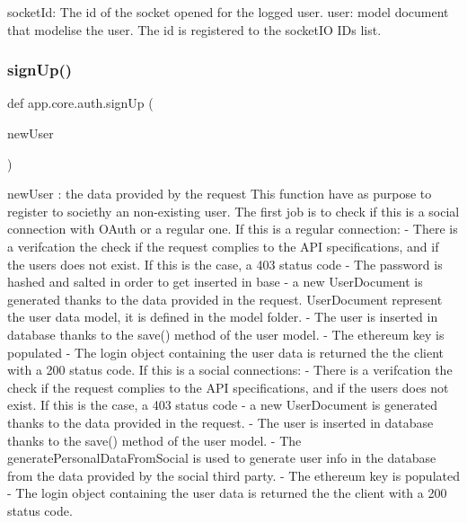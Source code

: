 \begin{DoxyVerb}socketId: The id of the socket opened for the logged user.
user: model document that modelise the user.
The id is registered to the socketIO IDs list.
\end{DoxyVerb}
 \mbox{\label{namespaceapp_1_1core_1_1auth_af8454a99dba50fcce1fc955a492871b8}} 
\subsubsection{\texorpdfstring{sign\+Up()}{signUp()}}
{\footnotesize\ttfamily def app.\+core.\+auth.\+sign\+Up (\begin{DoxyParamCaption}\item[{}]{new\+User }\end{DoxyParamCaption})}

\begin{DoxyVerb}newUser : the data provided by the request
This function have as purpose to register to societhy an non-existing user.
The first job is to check if this is a social connection with OAuth or a regular one.
If this is a regular connection:
    - There is a verifcation the check if the request complies to the API specifications, and if the users does not exist.
    If this is the case, a 403 status code
    - The password is hashed and salted in order to get inserted in base
    - a new UserDocument is generated thanks to the data provided in the request.
    UserDocument represent the user data model, it is defined in the model folder.
    - The user is inserted in database thanks to the save() method of the user model.
    - The ethereum key is populated
    - The login object containing the user data is returned the the client with a 200 status code.
If this is a social connections:
    - There is a verifcation the check if the request complies to the API specifications, and if the users does not exist.
    If this is the case, a 403 status code
    - a new UserDocument is generated thanks to the data provided in the request.
    - The user is inserted in database thanks to the save() method of the user model.
    - The generatePersonalDataFromSocial is used to generate user info in the database from the data provided by the social third party. 
    - The ethereum key is populated
    - The login object containing the user data is returned the the client with a 200 status code.
\end{DoxyVerb}
 
